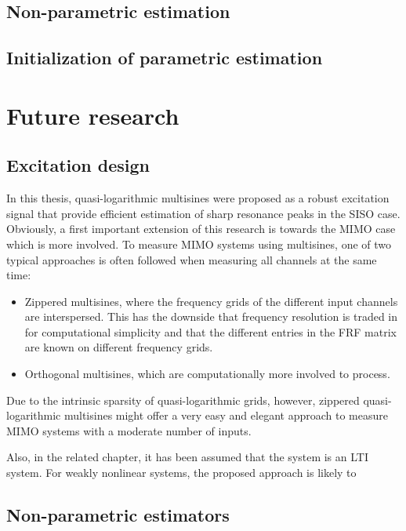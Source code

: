   \subsection{Non-parametric estimation}
  \subsection{Initialization of parametric estimation}


\section{Future research}
  \subsection{Excitation design}
  In this thesis, quasi-logarithmic multisines were proposed as a robust excitation signal that provide efficient estimation of sharp resonance peaks in the \gls{SISO} case.
  Obviously, a first important extension of this research is towards the \gls{MIMO} case which is more involved.
  To measure \gls{MIMO} systems using multisines, one of two typical approaches is often followed when measuring all channels at the same time:
  \begin{itemize}
    \item Zippered multisines, where the frequency grids of the different input channels are interspersed. This has the downside that frequency resolution is traded in for computational simplicity and that the different entries in the \gls{FRF} matrix are known on different frequency grids.
    \item Orthogonal multisines, which are computationally more involved to process.
  \end{itemize}
  Due to the intrinsic sparsity of quasi-logarithmic grids, however, zippered quasi-logarithmic multisines might offer a very easy and elegant  approach to measure \gls{MIMO} systems with a moderate number of inputs.

  Also, in the related chapter, it has been assumed that the system is an \gls{LTI} system.
  For weakly nonlinear systems, the proposed approach is likely to 


  \subsection{Non-parametric estimators}

